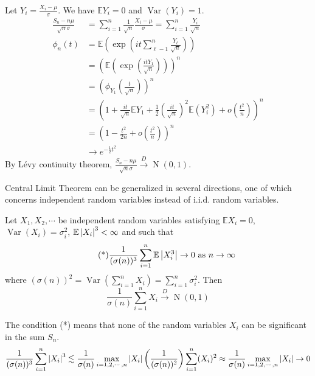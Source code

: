 \documentclass{huhtakm-template-book}
\newcommand{\expect}{\mathbb{E}}
\DeclareMathOperator{\N}{N}
\DeclareMathOperator{\Var}{Var}
\begin{document}
    \begin{proofing}
        Let $Y_{i}=\frac{X_{i}-\mu}{\sigma}$. We have $\expect Y_{i}=0$ and $\Var(Y_{i})=1$.
        \begin{align*}
            \frac{S_{n}-n\mu}{\sqrt{n}\sigma}&=\sum_{i=1}^{n}\frac{1}{\sqrt{n}}\frac{X_{i}-\mu}{\sigma}=\sum_{i=1}^{n}\frac{Y_{i}}{\sqrt{n}}\\
            \phi_{n}(t)&=\expect\left(\exp\left(it\sum_{\ell-1}^{n}\frac{Y_{\ell}}{\sqrt{n}}\right)\right)\\
            &=\left(\expect\left(\exp\left(\frac{itY_{1}}{\sqrt{n}}\right)\right)\right)^{n}\\
            &=\left(\phi_{Y_{1}}\left(\frac{t}{\sqrt{n}}\right)\right)^{n}\\
            \tag{Taylor expansion}
            &=\left(1+\frac{it}{\sqrt{n}}\expect Y_{1}+\frac{1}{2}\left(\frac{it}{\sqrt{n}}\right)^{2}\expect(Y_{i}^{2})+o\left(\frac{t^{2}}{n}\right)\right)^{n}\\
            &=\left(1-\frac{t^{2}}{2n}+o\left(\frac{t^{2}}{n}\right)\right)^{n}\\
            &\to e^{-\frac{1}{2}t^{2}}
        \end{align*}
        By L\'evy continuity theorem, $\frac{S_{n}-n\mu}{\sqrt{n}\sigma}\xrightarrow{D}\N(0,1)$.
    \end{proofing}
    Central Limit Theorem can be generalized in several directions, one of which concerns independent random variables instead of i.i.d. random variables.
    \begin{thm}
        Let $X_{1},X_{2},\cdots$ be independent random variables satisfying $\expect X_{i}=0$, $\Var(X_{i})=\sigma_{i}^{2}$, $\expect\abs{X_{i}}^{3}<\infty$ and such that
        \begin{equation*}
            \tag{*}
            \frac{1}{(\sigma(n))^{3}}\sum_{i=1}^{n}\expect\abs{X_{i}^{3}}\to 0 \text{ as }n\to\infty
        \end{equation*}
        where $(\sigma(n))^{2}=\Var(\sum_{i=1}^{n}X_{i})=\sum_{i=1}^{n}\sigma_{i}^{2}$. Then
        \begin{equation*}
            \frac{1}{\sigma(n)}\sum_{i=1}^{n}X_{i}\xrightarrow{D}\N(0,1)
        \end{equation*}
    \end{thm}
    \begin{rem}
        The condition (*) means that none of the random variables $X_{i}$ can be significant in the sum $S_{n}$.
        \begin{equation*}
            \frac{1}{(\sigma(n))^{3}}\sum_{i=1}^{n}\left|{X_{i}}\right|^{3}\lesssim\frac{1}{\sigma(n)}\max_{i=1,2,\cdots,n}\left|{X_{i}}\right|\left(\frac{1}{(\sigma(n))^{2}}\right)\sum_{i=1}^{n}(X_{i})^{2}\approx\frac{1}{\sigma(n)}\max_{i=1,2,\cdots,n}\left|{X_{i}}\right|\to 0
        \end{equation*}
    \end{rem}
\end{document}

